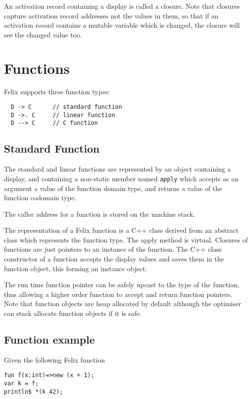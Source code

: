\documentclass[oneside]{book}
\begin{document}
An activation record containing a display is called a closure.
Note that closures capture activation record addresses not the
values in them, so that if an activation record contains a mutable
variable which is changed, the closure will see the changed value too.


\section{Functions}
Felix supports three function types:

\begin{verbatim}
  D -> C      // standard function
  D ->. C     // linear function
  D --> C     // C function
\end{verbatim}

\subsection{Standard Function}
The standard and linear functions are represented by an object containing a display,
and containing a non-static member named \verb$apply$ which accepts as an argument
a value of the function domain type, and returns a value of the function codomain type.

The caller address for a function is stored on the machine stack.

The representation of a Felix function is a C++ class derived from an abstract class
which represents the function type. The apply method is virtual. Closures of functions
are just pointers to an instance of the function. The C++ class constructor of a function
accepts the display values and saves them in the function object, this forming
an instance object. 

The run time function pointer can be safely upcast to the type of the function,
thus allowing a higher order function to accept and return function pointers.
Note that function objects are heap allocated by default although the optimiser
can stack allocate function objects if it is safe.


\subsection{Function example}
Given the following Felix function 

\begin{verbatim}
fun f(x:int)=>new (x + 1);
var k = f;
println$ *(k 42);
\end{verbatim}
\end{document}
